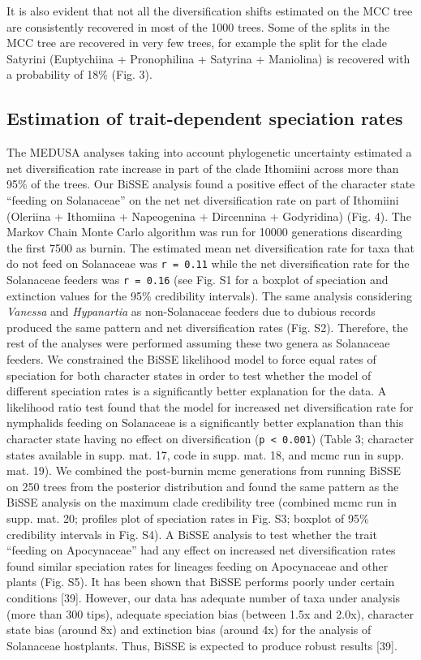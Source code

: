 \documentclass[10pt]{article}
\begin{document}
It is also evident that not all the diversification shifts estimated on
the MCC tree are consistently recovered in most of the 1000 trees. Some
of the splits in the MCC tree are recovered in very few trees, for
example the split for the clade Satyrini (Euptychiina + Pronophilina +
Satyrina + Maniolina) is recovered with a probability of 18\% (Fig. 3).

\subsection*{Estimation of trait-dependent speciation
rates}

The MEDUSA analyses taking into account phylogenetic uncertainty
estimated a net diversification rate increase in part of the clade
Ithomiini across more than 95\% of the trees. Our BiSSE analysis found a
positive effect of the character state ``feeding on Solanaceae'' on the
net net diversification rate on part of Ithomiini (Oleriina + Ithomiina
+ Napeogenina + Dircennina + Godyridina) (Fig. 4). The Markov Chain
Monte Carlo algorithm was run for 10000 generations discarding the first
7500 as burnin. The estimated mean net diversification rate for taxa
that do not feed on Solanaceae was \texttt{r = 0.11} while the net
diversification rate for the Solanaceae feeders was \texttt{r = 0.16}
(see Fig. S1 for a boxplot of speciation and extinction values for the
95\% credibility intervals). The same analysis considering
\emph{Vanessa} and \emph{Hypanartia} as non-Solanaceae feeders due to
dubious records produced the same pattern and net diversification rates
(Fig. S2). Therefore, the rest of the analyses were performed assuming
these two genera as Solanaceae feeders. We constrained the BiSSE
likelihood model to force equal rates of speciation for both character
states in order to test whether the model of different speciation rates
is a significantly better explanation for the data. A likelihood ratio
test found that the model for increased net diversification rate for
nymphalids feeding on Solanaceae is a significantly better explanation
than this character state having no effect on diversification
(\texttt{p \textless{} 0.001}) (Table 3; character states available in
supp. mat. 17, code in supp. mat. 18, and mcmc run in supp. mat. 19). We
combined the post-burnin mcmc generations from running BiSSE on 250
trees from the posterior distribution and found the same pattern as the
BiSSE analysis on the maximum clade credibility tree (combined mcmc run
in supp. mat. 20; profiles plot of speciation rates in Fig. S3; boxplot
of 95\% credibility intervals in Fig. S4). A BiSSE analysis to test
whether the trait ``feeding on Apocynaceae'' had any effect on increased
net diversification rates found similar speciation rates for lineages
feeding on Apocynaceae and other plants (Fig. S5). It has been shown
that BiSSE performs poorly under certain conditions {[}39{]}. However,
our data has adequate number of taxa under analysis (more than 300
tips), adequate speciation bias (between 1.5x and 2.0x), character state
bias (around 8x) and extinction bias (around 4x) for the analysis of
Solanaceae hostplants. Thus, BiSSE is expected to produce robust results
{[}39{]}.
\end{document}

